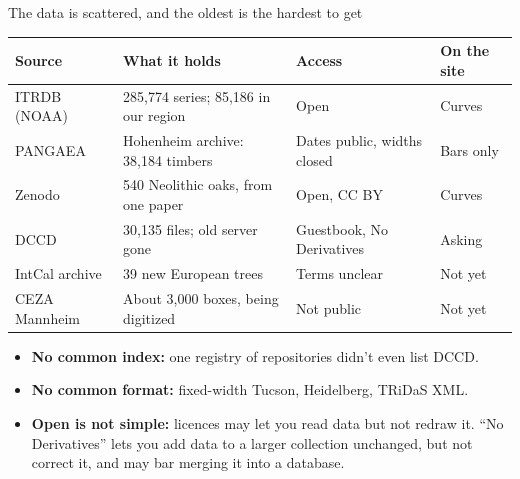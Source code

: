 \documentclass[aspectratio=169]{beamer}
\newcommand{\oakstatus}{Curves}
\newcommand{\oakstatus}{Next build}
\begin{document}
\begin{frame}{The data is scattered, and the oldest is the hardest to get}
\centering
\footnotesize
\begin{tabular}{@{}lp{5.3cm}p{3.9cm}l@{}}
\toprule
\textbf{Source} & \textbf{What it holds} & \textbf{Access} & \textbf{On the site}\\
\midrule
ITRDB (NOAA) & 285,774 series; 85,186 in our region & Open & Curves\\
PANGAEA & Hohenheim archive: 38,184 timbers & Dates public, widths closed & Bars only\\
Zenodo & 540 Neolithic oaks, from one paper & Open, CC BY & \oakstatus\\
DCCD & 30,135 files; old server gone & Guestbook, No Derivatives & Asking\\
IntCal archive & 39 new European trees & Terms unclear & Not yet\\
CEZA Mannheim & About 3,000 boxes, being digitized & Not public & Not yet\\
\bottomrule
\end{tabular}

\vspace{0.4em}
\begin{itemize}\footnotesize
\item \textbf{No common index:} one registry of repositories didn't even list DCCD.
\item \textbf{No common format:} fixed-width Tucson, Heidelberg, TRiDaS XML.
\item \textbf{Open is not simple:} licences may let you read data but not redraw it.
``No Derivatives'' lets you add data to a larger collection unchanged, but not correct it,
and may bar merging it into a database.
\end{itemize}
\end{frame}
\end{document}
